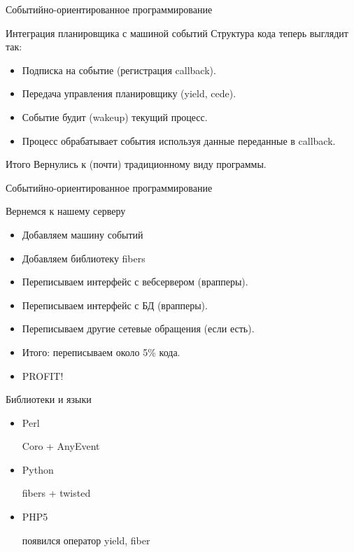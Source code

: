 \documentclass[aspectratio=169]{beamer}
\begin{document}
\begin{frame}{Событийно-ориентированное программирование}
    \begin{block}{Интеграция планировщика с машиной событий}
        Структура кода теперь выглядит так:
        \begin{itemize}
            \item Подписка на событие (регистрация callback).
            \item Передача управления планировщику (yield, cede).
            \item Событие будит (wakeup) текущий процесс.
            \item Процесс обрабатывает события используя данные переданные
                в callback.
        \end{itemize}
    \end{block}
    \pause
    \begin{block}{Итого}
        Вернулись к (почти) традиционному виду программы.
    \end{block}
\end{frame}

\begin{frame}{Событийно-ориентированное программирование}
    \begin{block}{Вернемся к нашему серверу}
        \begin{itemize}
            \item Добавляем машину событий
            \item Добавляем библиотеку fibers
            \item Переписываем интерфейс с вебсервером (врапперы).
            \item Переписываем интерфейс с БД (врапперы).
            \item Переписываем другие сетевые обращения (если есть).

            \pause\item Итого: переписываем около 5\% кода.
            \item PROFIT!
        \end{itemize}
    \end{block}
\end{frame}

\begin{frame}{Библиотеки и языки}
    \begin{itemize}
        \pause\item Perl
            \pause\par Coro + AnyEvent
        \pause\item Python
            \pause\par fibers + twisted
        \pause\item PHP5
            \pause\par появился оператор yield, fiber
    \end{itemize}
\end{frame}
\end{document}
